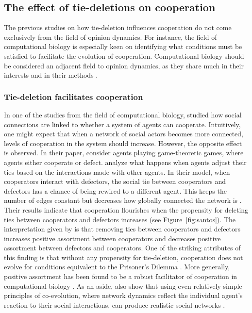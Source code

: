\documentclass[11pt]{article}
\begin{document}
\subsection{The effect of tie-deletions on cooperation}
The previous studies on how tie-deletion influences cooperation do not come exclusively from the field of opinion dynamics. For instance, the field of computational biology is especially keen on identifying what conditions must be satisfied to facilitate the evolution of cooperation. Computational biology should be considered an adjacent field to opinion dynamics, as they share much in their interests and in their methods \cite{dakin_dynamic_2018,melamed_strong_2016,pepper_mechanism_2002,santos_cooperation_2006, smaldino2019social}. 

\subsubsection{Tie-deletion facilitates cooperation}
\noindent In one of the studies from the field of computational biology,  studied how social connections are linked to whether a system of agents can cooperate. Intuitively, one might expect that when a network of social actors becomes more connected, levels of cooperation in the system should increase. However, the opposite effect is observed. In their paper,  consider agents playing game-theoretic games, where agents either cooperate or defect. 
 analyze what happens when agents adjust their ties based on the interactions made with other agents. In their model, when cooperators interact with defectors, the social tie between cooperators and defectors has a chance of being rewired to a different agent. This keeps the number of edges constant but decreases how globally connected the network is \cite{santos_cooperation_2006}. Their results indicate that cooperation flourishes when the propensity for deleting ties between cooperators and defectors increases (see Figure~\ref{fig:santos}). The interpretation given by  is that removing ties between cooperators and defectors increases positive assortment between cooperators and decreases positive assortment between defectors and cooperators. One of the striking attributes of this finding is that without any propensity for tie-deletion, cooperation does not evolve for conditions equivalent to the Prisoner's Dilemma \cite{santos_cooperation_2006}. More generally, positive assortment has been found to be a robust facilitator of cooperation in computational biology \cite{boyd_coordinated_2010,dakin_dynamic_2018,melamed_strong_2016,pepper_mechanism_2002}. As an aside,  also show that using even relatively simple principles of co-evolution, where network dynamics reflect the individual agent's reaction to their social interactions, can produce realistic social networks \cite{santos_cooperation_2006}. 
\end{document}
